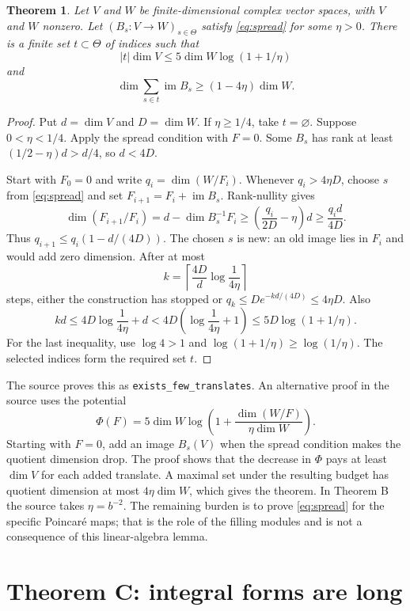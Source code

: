 \documentclass[11pt,oneside,openany]{amsbook}
\newtheorem{theorem}{Theorem}[section]
\theoremstyle{remark}
\numberwithin{equation}{section}
\begin{document}
\begin{theorem}
\label{thm:few-translates}
Let $V$ and $W$ be finite-dimensional complex vector spaces,
with $V$ and $W$ nonzero. Let $(B_s:V\to W)_{s\in\Theta}$ satisfy
\eqref{eq:spread} for some $\eta>0$. There is a finite set
$t\subset\Theta$ of indices such that
\[
|t|\dim V\le5\dim W\log(1+1/\eta)
\]
and
\[
\dim\sum_{s\in t}\operatorname{im}B_s
 \ge(1-4\eta)\dim W.
\]
\end{theorem}
\begin{proof}
Put $d=\dim V$ and $D=\dim W$. If $\eta\ge1/4$, take
$t=\varnothing$. Suppose $0<\eta<1/4$. Apply the spread
condition with $F=0$. Some $B_s$ has rank at least
$(1/2-\eta)d>d/4$, so $d<4D$.

Start with $F_0=0$ and write $q_i=\dim(W/F_i)$. Whenever
$q_i>4\eta D$, choose $s$ from \eqref{eq:spread} and set
$F_{i+1}=F_i+\operatorname{im}B_s$. Rank-nullity gives
\[
\dim(F_{i+1}/F_i)
=d-\dim B_s^{-1}F_i
\ge\left(\frac{q_i}{2D}-\eta\right)d
\ge\frac{q_i d}{4D}.
\]
Thus $q_{i+1}\le q_i(1-d/(4D))$. The chosen $s$ is new:
an old image lies in $F_i$ and would add zero dimension.
After at most
\[
k=\left\lceil\frac{4D}{d}\log\frac1{4\eta}\right\rceil
\]
steps, either the construction has stopped or
$q_k\le D e^{-kd/(4D)}\le4\eta D$. Also
\[
kd\le4D\log\frac1{4\eta}+d
  <4D\left(\log\frac1{4\eta}+1\right)
  \le5D\log(1+1/\eta).
\]
For the last inequality, use $\log4>1$ and
$\log(1+1/\eta)\ge\log(1/\eta)$. The selected
indices form the required set $t$.
\end{proof}
The source proves this as \texttt{exists\_few\_translates}.
An alternative proof in the source uses the potential
\[
\Phi(F)=5\dim W\log\left(1+
\frac{\dim(W/F)}{\eta\dim W}\right).
\]
Starting with $F=0$, add an image $B_s(V)$ when the spread
condition makes the quotient dimension drop. The proof shows
that the decrease in $\Phi$ pays at least $\dim V$ for each
added translate. A maximal set under the resulting budget
has quotient dimension at most $4\eta\dim W$, which gives
the theorem. In Theorem B the source takes $\eta=b^{-2}$.
The remaining burden is to prove \eqref{eq:spread} for the
specific Poincar\'e maps; that is the role of the filling
modules and is not a consequence of this linear-algebra lemma.

\chapter{Theorem C: integral forms are long}
\label{ch:long}
\end{document}
